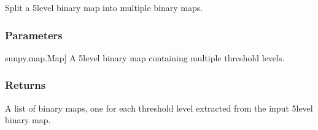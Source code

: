 \documentclass[letterpaper,10pt,english]{sphinxmanual}
\begin{document}
\begin{fulllineitems}
\label{\detokenize{pycatch/utils/ch_mapping:pycatch.utils.ch_mapping.from_5binmap}}
\pysigstartsignatures
{}
\pysigstopsignatures
\sphinxAtStartPar
Split a 5\sphinxhyphen{}level binary map into multiple binary maps.


\subsubsection{Parameters}
\label{\detokenize{pycatch/utils/ch_mapping:id17}}\begin{description}
\sphinxlineitem{binmap}{[}sunpy.map.Map{]}
\sphinxAtStartPar
A 5\sphinxhyphen{}level binary map containing multiple threshold levels.

\end{description}


\subsubsection{Returns}
\label{\detokenize{pycatch/utils/ch_mapping:id18}}\begin{description}
\sphinxAtStartPar
A list of binary maps, one for each threshold level extracted from the input 5\sphinxhyphen{}level binary map.

\end{description}

\end{fulllineitems}

\end{document}

